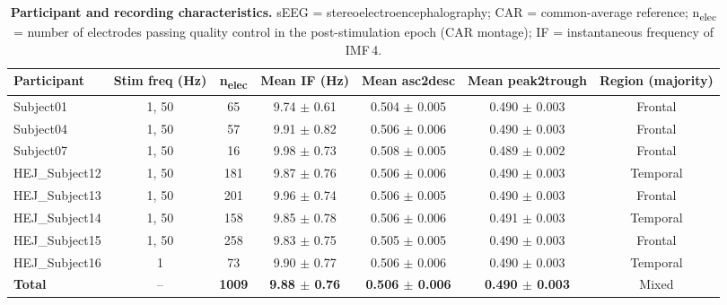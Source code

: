\begin{table}[h!]
\caption{\textbf{Participant and recording characteristics.}
sEEG = stereoelectroencephalography; CAR = common-average reference;
n\textsubscript{elec} = number of electrodes passing quality control in the
post-stimulation epoch (CAR montage); IF = instantaneous frequency of IMF\,4.
}
\label{tab:demographics}
\centering
\small
\begin{tabular}{lcccccc}
\toprule
\textbf{Participant} & \textbf{Stim freq (Hz)} & \textbf{n\textsubscript{elec}} &
\textbf{Mean IF (Hz)} & \textbf{Mean asc2desc} & \textbf{Mean peak2trough} &
\textbf{Region (majority)} \\
\midrule
Subject01         & 1, 50 &  65 & 9.74 $\pm$ 0.61 & 0.504 $\pm$ 0.005 & 0.490 $\pm$ 0.003 & Frontal \\
Subject04         & 1, 50 &  57 & 9.91 $\pm$ 0.82 & 0.506 $\pm$ 0.006 & 0.490 $\pm$ 0.003 & Frontal \\
Subject07         & 1, 50 &  16 & 9.98 $\pm$ 0.73 & 0.508 $\pm$ 0.005 & 0.489 $\pm$ 0.002 & Frontal \\
HEJ\_Subject12   & 1, 50 & 181 & 9.87 $\pm$ 0.76 & 0.506 $\pm$ 0.006 & 0.490 $\pm$ 0.003 & Temporal \\
HEJ\_Subject13   & 1, 50 & 201 & 9.96 $\pm$ 0.74 & 0.506 $\pm$ 0.005 & 0.490 $\pm$ 0.003 & Frontal \\
HEJ\_Subject14   & 1, 50 & 158 & 9.85 $\pm$ 0.78 & 0.506 $\pm$ 0.006 & 0.491 $\pm$ 0.003 & Temporal \\
HEJ\_Subject15   & 1, 50 & 258 & 9.83 $\pm$ 0.75 & 0.505 $\pm$ 0.005 & 0.490 $\pm$ 0.003 & Frontal \\
HEJ\_Subject16   & 1    &  73 & 9.90 $\pm$ 0.77 & 0.506 $\pm$ 0.006 & 0.490 $\pm$ 0.003 & Temporal \\
\midrule
\textbf{Total}   & --   & \textbf{1009} & \textbf{9.88 $\pm$ 0.76} & \textbf{0.506 $\pm$ 0.006} & \textbf{0.490 $\pm$ 0.003} & Mixed \\
\bottomrule
\end{tabular}
\end{table}
